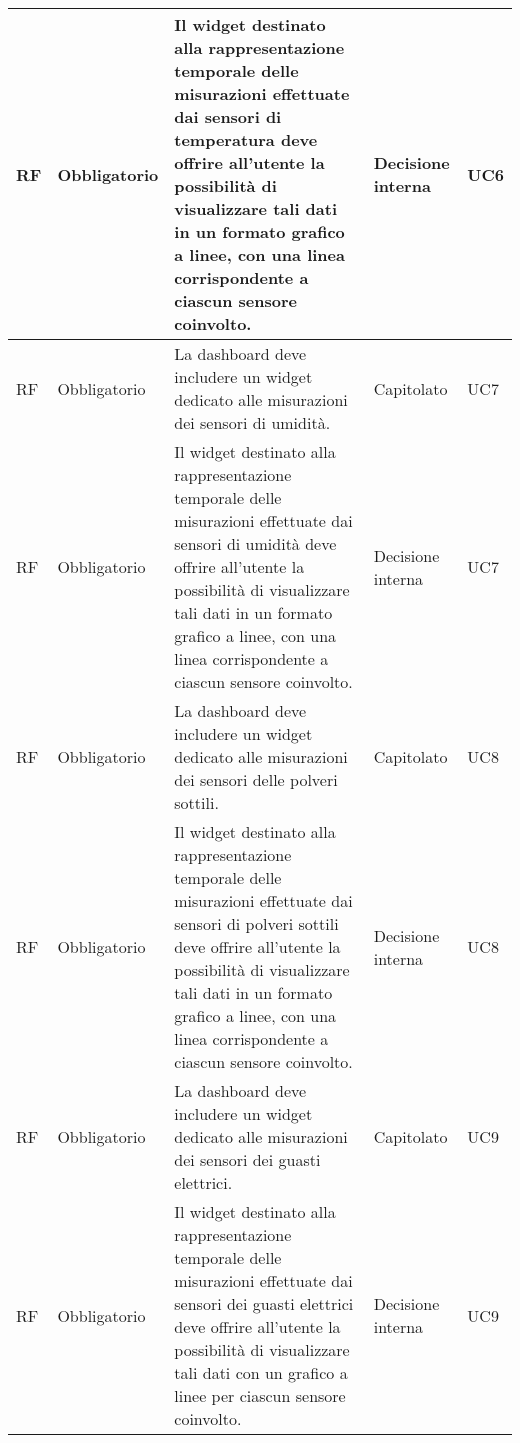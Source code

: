 \begin{longtable}{|C{1.5cm}|C{2cm}|L{5cm}|C{2cm}|C{1.5cm}|}
    \hline
     RF & Obbligatorio &Il widget destinato alla rappresentazione temporale delle misurazioni effettuate dai sensori di temperatura deve offrire all'utente la possibilità di visualizzare tali dati in un formato grafico a linee, con una linea corrispondente a ciascun sensore coinvolto.  & Decisione interna & UC6 \\
    
    \hline
     RF & Obbligatorio & La dashboard deve includere un widget dedicato alle misurazioni dei sensori di umidità. & Capitolato & UC7 \\
    
    \hline
     RF & Obbligatorio &Il widget destinato alla rappresentazione temporale delle misurazioni effettuate dai sensori di umidità deve offrire all'utente la possibilità di visualizzare tali dati in un formato grafico a linee, con una linea corrispondente a ciascun sensore coinvolto.  & Decisione interna & UC7 \\
    
    \hline
     RF & Obbligatorio & La dashboard deve includere un widget dedicato alle misurazioni dei sensori delle polveri sottili. & Capitolato & UC8 \\
    
    \hline
     RF & Obbligatorio &Il widget destinato alla rappresentazione temporale delle misurazioni effettuate dai sensori di polveri sottili deve offrire all'utente la possibilità di visualizzare tali dati in un formato grafico a linee, con una linea corrispondente a ciascun sensore coinvolto.  & Decisione interna & UC8 \\
    
    \hline
     RF & Obbligatorio & La dashboard deve includere un widget dedicato alle misurazioni dei sensori dei guasti elettrici. & Capitolato & UC9 \\
    
    \hline
     RF & Obbligatorio &Il widget destinato alla rappresentazione temporale delle misurazioni effettuate dai sensori dei guasti elettrici  deve offrire all'utente la possibilità di visualizzare tali dati con un grafico a linee per ciascun sensore coinvolto.  & Decisione interna & UC9 \\
    

\end{longtable}
